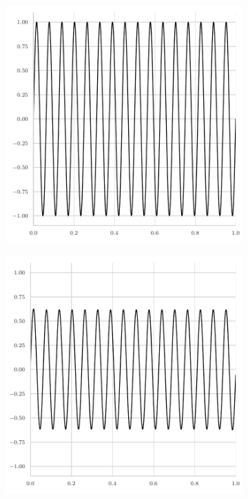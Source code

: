 \begin{figure}
\begin{subfigure}[b]{0.45\textwidth}
	\end{subfigure}
	\begin{subfigure}[b]{0.45\textwidth}
	\centering
	\includegraphics[width=\textwidth]{figures/jacobi_initial_error4.pdf}
	\end{subfigure}
	\hfill
	\begin{subfigure}[b]{0.45\textwidth}
		\centering
		\includegraphics[width=\textwidth]{figures/jacobi_final_error4.pdf}

\end{subfigure}
\end{figure}

